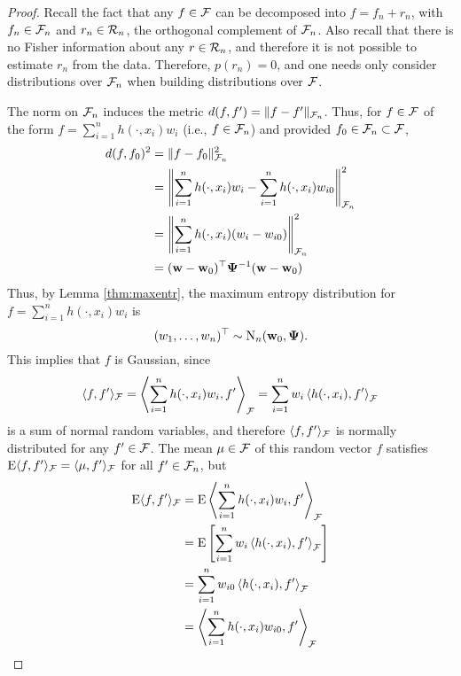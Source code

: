 \begin{proof}
  Recall the fact that any $f \in {\mathcal F}$ can be decomposed into $f = f_n + r_n$, with $f_n \in {\mathcal F}_n$ and $r_n \in {\mathcal R}_n$, the orthogonal complement of ${\mathcal F}_n$.
  Also recall that there is no Fisher information about any $r \in {\mathcal R}_n$, and therefore it is not possible to estimate $r_n$ from the data.
  Therefore, $p(r_n) = 0$, and one needs only consider distributions over ${\mathcal F}_n$ when building distributions over ${\mathcal F}$.
  
  The norm on ${\mathcal F}_n$ induces the metric $d(f,f') = \lVert f - f'\rVert_{{\mathcal F}_n}$.
  Thus, for $f \in {\mathcal F}$ of the form $f = \sum_{i=1}^n h(\cdot,x_i)w_i$ (i.e., $f \in {\mathcal F}_n$) and provided $f_0 \in {\mathcal F}_n \subset {\mathcal F}$,
  \begin{align*}
    d(f,f_0)^2 
    &= \lVert f - f_0\rVert_{{\mathcal F}_n}^2 \\
    &= \left\Vert \sum_{i=1}^n h(\cdot,x_i)w_i - \sum_{i=1}^n h(\cdot,x_i)w_{i0} \right\Vert_{{\mathcal F}_n}^2 \\
    &= \left\Vert \sum_{i=1}^n h(\cdot,x_i)(w_i - w_{i0}) \right\Vert_{{\mathcal F}_n}^2 \\
    &= ({\mathbf w} - {\mathbf w}_0)^\top{\bm\Psi}^{-1} ({\mathbf w} - {\mathbf w}_0) \\
  \end{align*}
  Thus, by Lemma \ref{thm:maxentr}, the maximum entropy distribution for $f = \sum_{i=1}^n h(\cdot,x_i)w_i$ is
  \[
    (w_1,\dots,w_n)^\top \sim \operatorname{N}_n({\mathbf w}_0,{\bm\Psi}).
  \]
  This implies that $f$ is Gaussian, since
  \begin{align*}
    \langle f,f' \rangle_{{\mathcal F}}
    = \left\langle \sum_{i=1}^n h(\cdot,x_i)w_i, f' \right\rangle_{{\mathcal F}} 
    = \sum_{i=1}^n w_i \left\langle  h(\cdot,x_i), f' \right\rangle_{{\mathcal F}}  
  \end{align*}
  is a sum of normal random variables, and therefore $\langle f,f' \rangle_{{\mathcal F}}$ is normally distributed for any $f' \in {\mathcal F}$.
  The mean $\mu\in{\mathcal F}$ of this random vector $f$ satisfies $\operatorname{E}\langle f,f'\rangle_{{\mathcal F}}  = \langle\mu,f'\rangle_{{\mathcal F}}$ for all $f'\in{\mathcal F}_n$, but
  \begin{align*}
    \E\ip{f,f'}_{\cF}  
    &= \E \left\langle \sum_{i=1}^n h(\cdot,x_i)w_i, f' \right\rangle_{\cF} \\
    &= \E \left[ \sum_{i=1}^n w_i \left\langle  h(\cdot,x_i), f' \right\rangle_{\cF} \right] \\
    &= \sum_{i=1}^n w_{i0} \left\langle  h(\cdot,x_i), f' \right\rangle_{\cF} \\
    &= \left\langle \sum_{i=1}^n h(\cdot,x_i)w_{i0}, f' \right\rangle_{\cF} \\

\end{align*}
\end{proof}
